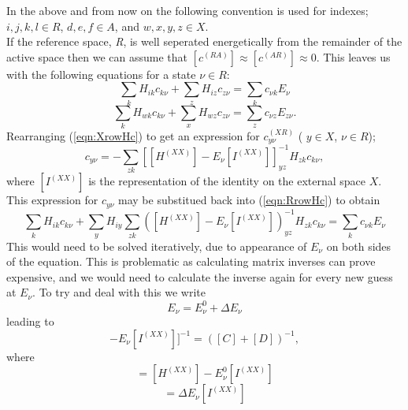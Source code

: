 \documentclass[12pt]{article}
\begin{document}
\noindent In the above and from now on the following convention is used for indexes;
 $i,j,k,l \in R$,  $d,e,f \in A$, and $w,x,y,z \in X$. \\

\noindent  If the reference space, \emph{R}, is well seperated energetically from the 
remainder of the active space then we can assume that $[c^{(RA)}]\approx[c^{(AR)}]\approx 0 $.
This leaves us with the following equations for a state $\nu \in R$:
\begin{equation}
\sum_{k} H_{ik}c_{k\nu}
+\sum_{z}H_{iz}c_{z\nu}
= \sum_{k}c_{\nu k}E_{\nu}
\label{eqn:RrowHc}
\end{equation}
\begin{equation}
\sum_{k} H_{wk}c_{k\nu}
+\sum_{x}H_{wz}c_{z\nu}
= \sum_{z}c_{\nu z}E_{z\nu}.
\label{eqn:XrowHc}
\end{equation}
\noindent Rearranging (\ref{eqn:XrowHc}) to get an expression for $c^{(XR)}_{ y\nu}$ ( $y \in X$, $\nu \in R$);
\begin{equation}
c_{y\nu} = -\sum_{zk}[[H^{(XX)}]-E_{\nu}[I^{(XX)}]]^{-1}_{yz}H_{zk}c_{k\nu},
\label{eqn:cXRfrominverse}
\end{equation}
\noindent where $[I^{(XX)}]$ is the representation of the identity on the external space $X$. This
expression for $ c_{y\nu}$  may be substitued back into (\ref{eqn:RrowHc}) to obtain
\begin{equation}
\sum_{k} H_{ik}c_{k\nu}
+\sum_{y}H_{iy}\sum_{zk}([H^{(XX)}]-E_{\nu}[I^{(XX)}])^{-1}_{yz}H_{zk}c_{k\nu}
= \sum_{k}c_{\nu k}E_{\nu}
\label{eqn:RrowHcsub}
\end{equation}
\noindent This would need to be solved iteratively, due to appearance of $E_{\nu}$ on both
sides of the equation. This is problematic as calculating matrix inverses can prove expensive,
and we would need to calculate the inverse again for every new guess at $E_{\nu}$. To try and deal with this
we write
\begin{equation}
E_{\nu} = E_{\nu}^{0}+\Delta E_{\nu} 
\end{equation}
\noindent leading to
\begin{equation} 
[[H^{(XX)}]-E_{\nu}[I^{(XX)}]]^{-1} = ([C]+[D])^{-1}, 
\end{equation}
\noindent where
\begin{equation}
[C] = [H^{(XX)}]-E^{0}_{\nu}[I^{(XX)}]
\end{equation}
\begin{equation}
[D] = \Delta E_{\nu} [I^{(XX)}] 
\end{equation}  
\end{document}
